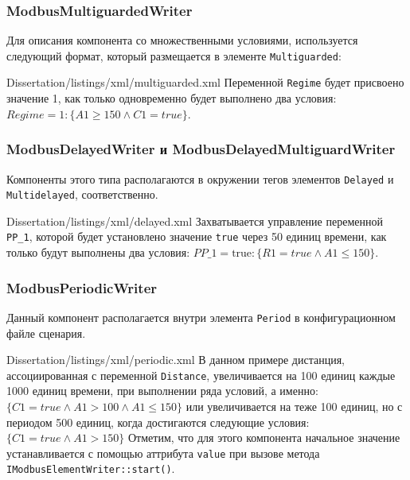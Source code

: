 \subsubsection{ModbusMultiguardedWriter}
Для описания компонента со множественными условиями, используется следующий формат,
который размещается в элементе \texttt{Multiguarded}:

        {Dissertation/listings/xml/multiguarded.xml}
Переменной \texttt{Regime} будет присвоено значение 1, как только 
одновременно будет выполнено два условия: $Regime = 1: \{A1 \ge 150 \wedge C1 = true\}$.

\subsubsection{ModbusDelayedWriter и ModbusDelayedMultiguardWriter}
Компоненты этого типа располагаются в окружении тегов элементов \texttt{Delayed} и \texttt{Multidelayed}, соответственно.

        {Dissertation/listings/xml/delayed.xml}
Захватывается управление переменной \texttt{PP\_1}, которой будет установлено значение \texttt{true}
через 50 единиц времени, как только будут выполнены два условия:
$PP\_1 = \mbox{true}: \{R1 = true \wedge A1 \le 150\}$.


\subsubsection{ModbusPeriodicWriter}
Данный компонент располагается внутри элемента \texttt{Period} в конфигурационном файле сценария.

        {Dissertation/listings/xml/periodic.xml}
В данном примере дистанция, ассоциированная с переменной \texttt{Distance}, увеличивается на 100 единиц каждые 1000 единиц времени,
при выполнении ряда условий, а именно: $\{C1 = true \wedge A1 > 100 \wedge A1 \le 150 \}$ или
увеличивается на теже 100 единиц, но с периодом 500 единиц, когда достигаются следующие условия:
$\{C1 = true \wedge A1 > 150\}$
Отметим, что для этого компонента начальное значение устанавливается с помощью аттрибута \texttt{value}
при вызове метода \texttt{IModbusElementWriter::start()}.


